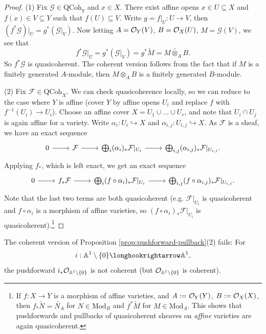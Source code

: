 \begin{proof}
  (1) Fix $\mathcal{G} \in \mathrm{QCoh}_Y$
  and $x \in X$. There exist affine opens
  $x \in U \subseteq X$ and $f(x) \in V \subseteq Y$
  such that $f(U) \subseteq V$.
  Write $g = f|_U : U \to V$,
  then $(f^* \mathcal{G})|_U = g^* (\mathcal{G}|_V)$.
  Now letting $A = \mathcal{O}_Y(V)$, $B = \mathcal{O}_X(U)$,
  $M = \mathcal{G}(V)$,
  we see that
  \[
    f^* \mathcal{G}|_U
    = g^*(\mathcal{G}|_V)
    = g^* \widetilde{M}
    = \widetilde{M \otimes_A B}.
  \]
  So $f^* \mathcal{G}$ is quasicoherent.
  The coherent version follows from
  the fact that if $M$ is a finitely
  generated $A$-module, then
  $M \otimes_A B$ is a finitely generated
  $B$-module.

  (2) Fix $\mathcal{F} \in \mathrm{QCoh}_X$.
  We can check quasicoherence locally,
  so we can reduce to the case where
  $Y$ is affine (cover $Y$ by affine opens
  $U_i$ and replace $f$ with $f^{-1}(U_i) \to U_i$).
  Choose an affine cover $X = U_1 \cup \dots \cup U_r$,
  and note that $U_i \cap U_j$ is again
  affine for a variety.
  Write $\alpha_i : U_i \hookrightarrow X$
  and $\alpha_{i, j} : U_{i, j} \hookrightarrow X$.
  As $\mathcal{F}$ is a sheaf,
  we have an exact sequence
  \[
    \begin{tikzcd}
      0 \ar[r] & \mathcal{F}
      \ar[r] & \bigoplus_i (\alpha_i)_* \mathcal{F}|_{U_i}
      \ar[r] & \bigoplus_{i, j} (\alpha_{i, j})_* \mathcal{F}|_{U_{i, j}}.
    \end{tikzcd}
  \]
  Applying $f_*$, which is left exact,
  we get an exact sequence
  \[
    \begin{tikzcd}
      0 \ar[r] & f_* \mathcal{F}
      \ar[r] & \bigoplus_i(f \circ \alpha_i)_* \mathcal{F}|_{U_i}
      \ar[r] & \bigoplus_{i, j} (f \circ \alpha_{i, j})_* \mathcal{F}|_{U_{i, j}}.
    \end{tikzcd}
  \]
  Note that the last two terms
  are both quasicoherent (e.g.
  $\mathcal{F}|_{U_i}$ is
  quasicoherent and $f \circ \alpha_i$
  is a morphism of affine varieties, so
  $(f \circ \alpha_i)_* \mathcal{F}|_{U_i}$
  is quasicoherent).\footnote{If $f : X \to Y$ is a morphism of affine varieties, and $A := \mathcal{O}_Y(Y)$, $B := \mathcal{O}_X(X)$, then $f_* \widetilde{N} = \widetilde{N_A}$ for
  $N \in \mathrm{Mod}_B$ and $f^* \widetilde{M}$ for $M \in \mathrm{Mod}_A$. This shows that pushforwards and pullbacks of quasicoherent sheaves on \emph{affine} varieties are again quasicoherent.}
\end{proof}

\begin{remark}
  The coherent version of Proposition
  \ref{prop:pushforward-pullback}(2) fails:
  For
  \[i : \Affine^1 \setminus \{0\} \longhookrightarrow \Affine^1,\]
  the
  pushforward
  $i_* \mathcal{O}_{\mathbb{A}^1 \setminus \{0\}}$
  is not coherent (but $\mathcal{O}_{\mathbb{A}^1 \setminus \{0\}}$ is coherent).
\end{remark}

